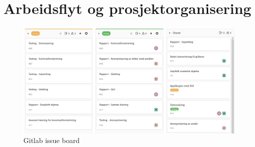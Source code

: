 \addappendix
\section{Arbeidsflyt og prosjektorganisering}
\label{sec:Arbeidsflyt}

\begin{figure}
\begin{center}
    \includegraphics[width=1\columnwidth]{bilder/issueboard.png}
    \caption{Gitlab issue board \label{Fig:issueboard}}
\end{center}
\end{figure}